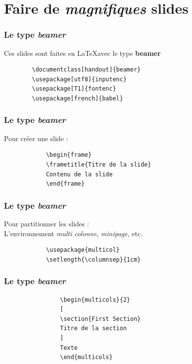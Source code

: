 \documentclass[handout]{beamer}
\begin{document}
\section{Faire de \emph{magnifiques} slides}


\begin{frame}[fragile=singleslide]
	\frametitle{Le type \textit{beamer}}
	\centering Ces slides sont faites en \LaTeX avec le type \textbf{beamer}\\

	\begin{verbatim}
		\documentclass[handout]{beamer}
		\usepackage[utf8]{inputenc}
		\usepackage[T1]{fontenc}
		\usepackage[french]{babel}
	\end{verbatim}
\end{frame}

\begin{frame}[fragile=singleslide]
	\frametitle{Le type \textit{beamer}}
	\centering
	Pour créer une slide :

			\begin{verbatim}
			\begin{frame}
			\frametitle{Titre de la slide}
			Contenu de la slide
			\end{frame}
			\end{verbatim}

\end{frame}

\begin{frame}[fragile=singleslide]
	\frametitle{Le type \textit{beamer}}
	\centering
	Pour partitionner les slides :\\
	L'environnement \textit{multi colonne}, \textit{minipage}, etc.

			\begin{verbatim}
			\usepackage{multicol}
			\setlength{\columnsep}{1cm}
			\end{verbatim}

\end{frame}

\begin{frame}[fragile=singleslide]
	\frametitle{Le type \textit{beamer}}
	\centering

			\begin{verbatim}
				\begin{multicols}{2}
				[
				\section{First Section}
				Titre de la section
				]
				Texte
				\end{multicols}
			\end{verbatim}

\end{frame}
\end{document}
